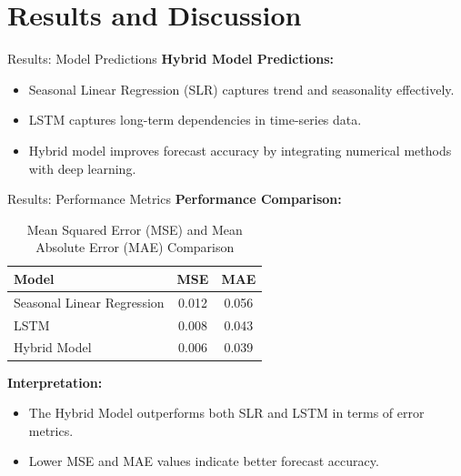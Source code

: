 \documentclass[10pt]{beamer}
\begin{document}
\section{Results and Discussion}
\begin{frame}{Results: Model Predictions}
    \textbf{Hybrid Model Predictions:}
    \begin{itemize}
        \item Seasonal Linear Regression (SLR) captures trend and seasonality effectively.
        \item LSTM captures long-term dependencies in time-series data.
        \item Hybrid model improves forecast accuracy by integrating numerical methods with deep learning.
    \end{itemize}
\end{frame}

\begin{frame}{Results: Performance Metrics}
    \textbf{Performance Comparison:}
    \begin{table}[ht]
        \centering
        \begin{tabular}{lcc}
            \hline
            \textbf{Model} & \textbf{MSE} & \textbf{MAE} \\
            \hline
            Seasonal Linear Regression & 0.012 & 0.056 \\
            LSTM & 0.008 & 0.043 \\
            Hybrid Model & 0.006 & 0.039 \\
            \hline
        \end{tabular}
        \caption{Mean Squared Error (MSE) and Mean Absolute Error (MAE) Comparison}
    \end{table}

    \singlespacing

    \textbf{Interpretation:}
    \begin{itemize}
        \item The Hybrid Model outperforms both SLR and LSTM in terms of error metrics.
        \item Lower MSE and MAE values indicate better forecast accuracy.
    \end{itemize}
\end{frame}
\end{document}
